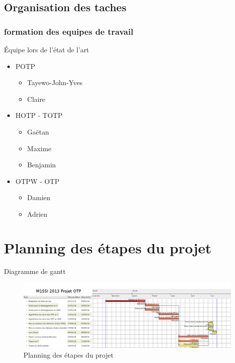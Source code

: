 \documentclass{beamer}
\begin{document}
\subsection{Organisation des taches}
\begin{frame}
\frametitle{formation des equipes de travail}
\begin{block}{Équipe lors de l'état de l'art}%
  \begin{itemize}
    \item POTP
    \begin{itemize}
      \item Tayewo-John-Yves 
      \item Claire 
    \end{itemize}
    \item HOTP - TOTP
    \begin{itemize}
      \item Gaëtan 
      \item Maxime 
      \item Benjamin 
    \end{itemize}
    \item OTPW - OTP
    \begin{itemize}
      \item Damien 
      \item Adrien  %
    \end{itemize}
  \end{itemize}
\end{block}

\end{frame}

\section{Planning des étapes du projet}
\begin{block}{Diagramme de gantt}
  \begin{figure}
    \includegraphics[scale=0.1]{img/gantt.png} %
    \caption{Planning des étapes du projet}
  \end{figure}
\end{block}
\end{document}
